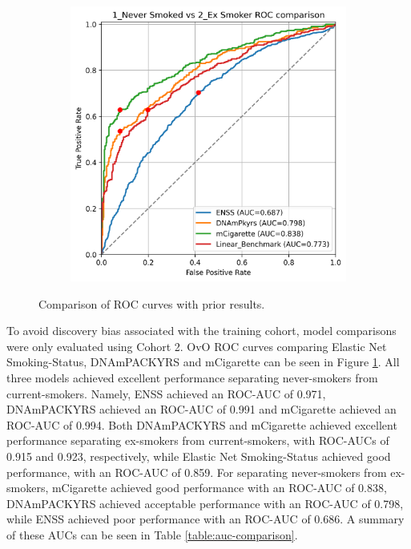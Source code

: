\documentclass{article} %
\begin{document}
\begin{figure}[p]
\begin{subfigure}{0.48\linewidth}
    \end{subfigure}
    \begin{subfigure}{0.48\linewidth}
        \centering
        \includegraphics[width=\linewidth]{comparison_1v2.png}
    \end{subfigure}
    \caption[Comparison of ROC curves with prior results]{Comparison of ROC curves with prior results. }
    \label{fig:comparison-rocs}
\end{figure}

To avoid discovery bias associated with the training cohort, model comparisons were only evaluated using Cohort 2. OvO ROC curves comparing Elastic Net Smoking-Status, DNAmPACKYRS and mCigarette can be seen in Figure \ref{fig:comparison-rocs}. All three models achieved excellent performance separating never-smokers from current-smokers. Namely, ENSS achieved an ROC-AUC of 0.971, DNAmPACKYRS achieved an ROC-AUC of 0.991 and mCigarette achieved an ROC-AUC of 0.994. Both DNAmPACKYRS and mCigarette achieved excellent performance separating ex-smokers from current-smokers, with ROC-AUCs of 0.915 and 0.923, respectively, while Elastic Net Smoking-Status achieved good performance, with an ROC-AUC of 0.859. For separating never-smokers from ex-smokers, mCigarette achieved good performance with an ROC-AUC of 0.838, DNAmPACKYRS achieved acceptable performance with an ROC-AUC of 0.798, while ENSS achieved poor performance with an ROC-AUC of 0.686. A summary of these AUCs can be seen in Table \ref{table:auc-comparison}.
\end{document}
